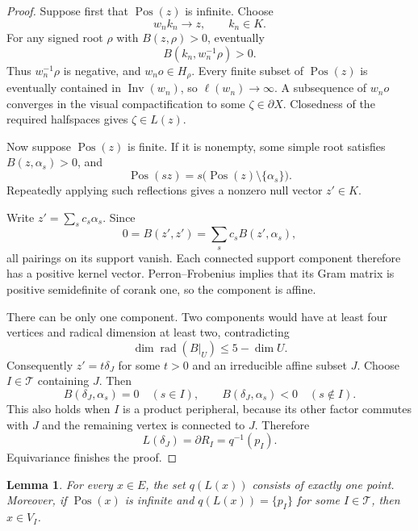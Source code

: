 \documentclass[11pt,reqno]{amsart}
\DeclareMathOperator{\Inv}{Inv}
\theoremstyle{plain}
\newtheorem{lemma}[theorem]{Lemma}
\theoremstyle{definition}
\theoremstyle{remark}
\numberwithin{equation}{section}
\DeclareMathOperator{\Pos}{Pos}
\begin{document}
\begin{proof}
Suppose first that $\Pos(z)$ is infinite.
Choose
\[
    w_nk_n\longrightarrow z,\qquad k_n\in K.
\]
For any signed root $\rho$ with $B(z,\rho)>0$,
eventually
\[
    B(k_n,w_n^{-1}\rho)>0.
\]
Thus $w_n^{-1}\rho$ is negative, and $w_no\in H_\rho$.
Every finite subset of $\Pos(z)$ is eventually contained
in $\Inv(w_n)$, so $\ell(w_n)\to\infty$.
A subsequence of $w_no$ converges in the visual
compactification to some $\zeta\in\partial X$.
Closedness of the required halfspaces gives
$\zeta\in L(z)$.

Now suppose $\Pos(z)$ is finite.
If it is nonempty, some simple root satisfies
$B(z,\alpha_s)>0$, and
\[
    \Pos(sz)=s\bigl(\Pos(z)\setminus\{\alpha_s\}\bigr).
\]
Repeatedly applying such reflections gives a nonzero
null vector $z'\in K$.

Write $z'=\sum_s c_s\alpha_s$.
Since
\[
    0=B(z',z')=\sum_s c_sB(z',\alpha_s),
\]
all pairings on its support vanish.
Each connected support component therefore has a positive
kernel vector.
Perron--Frobenius implies that its Gram matrix is positive
semidefinite of corank one, so the component is affine.

There can be only one component.
Two components would have at least four vertices and
radical dimension at least two, contradicting
\[
    \dim\operatorname{rad}(B|_U)\leq5-\dim U.
\]
Consequently $z'=t\delta_J$ for some $t>0$ and an
irreducible affine subset $J$.
Choose $I\in\mathcal T$ containing $J$.
Then
\[
    B(\delta_J,\alpha_s)=0\quad(s\in I),
    \qquad
    B(\delta_J,\alpha_s)<0\quad(s\notin I).
\]
This also holds when $I$ is a product peripheral,
because its other factor commutes with $J$ and the
remaining vertex is connected to $J$.
Therefore
\[
    L(\delta_J)=\partial R_I=q^{-1}(p_I).
\]
Equivariance finishes the proof.
\end{proof}

\begin{lemma}\label{lem:32-unique-image}
For every $x\in E$, the set $q(L(x))$ consists of exactly
one point. Moreover, if $\Pos(x)$ is infinite and
$q(L(x))=\{p_I\}$ for some $I\in\mathcal T$, then $x\in V_I$.
\end{lemma}
\end{document}

